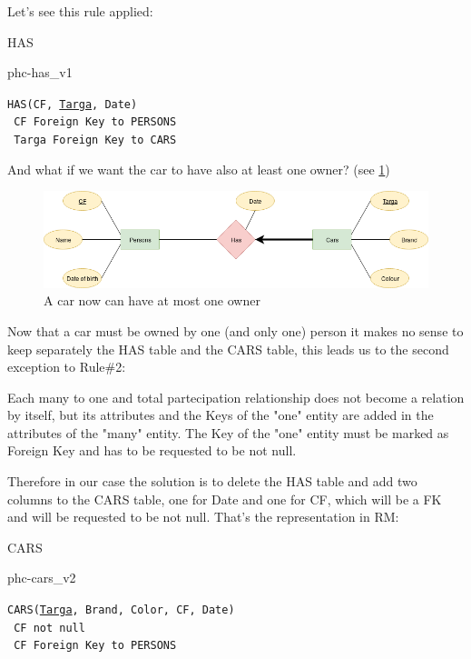 \documentclass[class=book, crop=false, oneside]{standalone}
\newcommand\tab[1][1cm]{\hspace*{#1}}
\begin{document}
Let's see this rule applied:
\vskip 20pt
\begin{minipage}{.8\textwidth}
	HAS
	\begin{table}[H]
		{phc-has_v1}
	\end{table}
	\texttt{HAS(CF, \underline{Targa}, Date)}\\
	\tab[.4cm] \texttt{	CF Foreign Key to PERSONS}\\
	\tab[.4cm] \texttt{	Targa Foreign Key to CARS}
\end{minipage}
\vskip 20pt
And what if we want the car to have also at least one owner? (see \ref{diagram1_02})
\begin{figure}[H]
	\centering
	\includegraphics[width=\textwidth,keepaspectratio]{diagram1_02.png}
	\caption{A car now can have at most one owner}
	\label{diagram1_02}
\end{figure}
Now that a car must be owned by one (and only one) person it makes no sense to keep separately the HAS table and the CARS table, this leads us to the second exception to Rule\#2:

Each many to one and total partecipation relationship does not become a relation by itself, but its attributes and the Keys of the "one" entity are added in the attributes of the "many" entity. The Key of the "one" entity must be marked as Foreign Key and has to be requested to be not null.

Therefore in our case the solution is to delete the HAS table and add two columns to the CARS table, one for Date and one for CF, which will be a FK and will be requested to be not null.
That's the representation in RM:
\vskip 20pt
\begin{minipage}{.8\textwidth}
	CARS
	\begin{table}[H]
		{phc-cars_v2}
	\end{table}
	\texttt{CARS(\underline{Targa}, Brand, Color, CF, Date)}\\
	\tab[.4cm] \texttt{	CF not null}\\
	\tab[.4cm] \texttt{	CF Foreign Key to PERSONS}
\end{minipage}
\vskip 20pt
\end{document}
